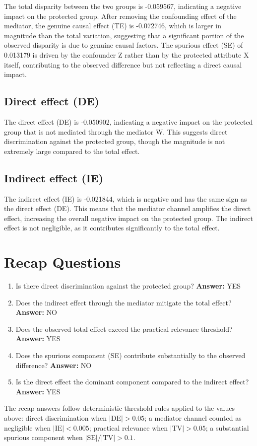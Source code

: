 \documentclass[11pt]{article}
\begin{document}
The total disparity between the two groups is -0.059567, indicating a negative impact on the protected group. After removing the confounding effect of the mediator, the genuine causal effect (TE) is -0.072746, which is larger in magnitude than the total variation, suggesting that a significant portion of the observed disparity is due to genuine causal factors. The spurious effect (SE) of 0.013179 is driven by the confounder Z rather than by the protected attribute X itself, contributing to the observed difference but not reflecting a direct causal impact.

\subsection{Direct effect (DE)}

The direct effect (DE) is -0.050902, indicating a negative impact on the protected group that is not mediated through the mediator W. This suggests direct discrimination against the protected group, though the magnitude is not extremely large compared to the total effect.

\subsection{Indirect effect (IE)}

The indirect effect (IE) is -0.021844, which is negative and has the same sign as the direct effect (DE). This means that the mediator channel amplifies the direct effect, increasing the overall negative impact on the protected group. The indirect effect is not negligible, as it contributes significantly to the total effect.

\section{Recap Questions}

\begin{enumerate}
\item Is there direct discrimination against the protected group? \textbf{Answer:} YES
\item Does the indirect effect through the mediator mitigate the total effect? \textbf{Answer:} NO
\item Does the observed total effect exceed the practical relevance threshold? \textbf{Answer:} YES
\item Does the spurious component (SE) contribute substantially to the observed difference? \textbf{Answer:} NO
\item Is the direct effect the dominant component compared to the indirect effect? \textbf{Answer:} YES
\end{enumerate}

\vspace{1em}
\noindent\footnotesize
The recap answers follow deterministic threshold rules applied to the values above: direct discrimination when $|\mathrm{DE}| > 0.05$; a mediator channel counted as negligible when $|\mathrm{IE}| < 0.005$; practical relevance when $|\mathrm{TV}| > 0.05$; a substantial spurious component when $|\mathrm{SE}| / |\mathrm{TV}| > 0.1$.
\end{document}

